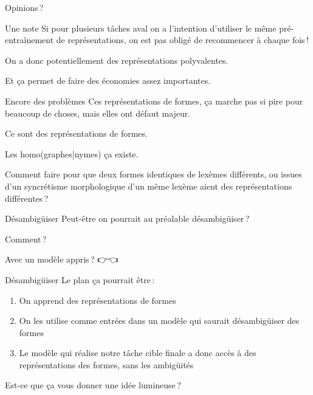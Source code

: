 \documentclass[
	xcolor={svgnames},
	aspectratio=169,
	french,
]{beamer}
\begin{document}
\begin{frame}[standout]
	Opinions ?
\end{frame}

\begin{frame}{Une note}
	Si pour plusieurs tâches aval on a l'intention d'utiliser le même pré-entraînement de représentations, on est pas obligé de recommencer à chaque fois !

	\pause

	On a donc potentiellement des représentations \alert{polyvalentes}.

	\pause

	Et ça permet de faire des économies assez importantes.
\end{frame}

\begin{frame}{Encore des problèmes}
	Ces représentations de formes, ça marche  pas si pire pour beaucoup de choses, mais elles ont défaut majeur.

	\pause

	Ce sont des représentations de \alert{formes}.

	\pause

	Les homo(graphes|nymes) ça existe.

	\pause

	Comment faire pour que deux formes identiques de lexèmes différents, ou issues d'un syncrétisme morphologique d'un même lexème aient des représentations différentes ?
\end{frame}

\begin{frame}{Désambigüiser}
	Peut-être on pourrait au préalable désambigüiser ?

	\pause

	Comment ?

	\pause

	{\footnotesize Avec un modèle appris ? 👉👈}
\end{frame}

\begin{frame}{Désambigüiser}
	Le plan ça pourrait être :

	\begin{enumerate}[<+->]
		\item On apprend des représentations de formes
		\item On les utilise comme entrées dans un modèle qui saurait désambigüiser des formes
		\item Le modèle qui réalise notre tâche cible finale a donc accès à des représentations des formes, sans les ambigüités
	\end{enumerate}

	\pause

	Est-ce que ça vous donner une idée lumineuse ?
\end{frame}
\end{document}
